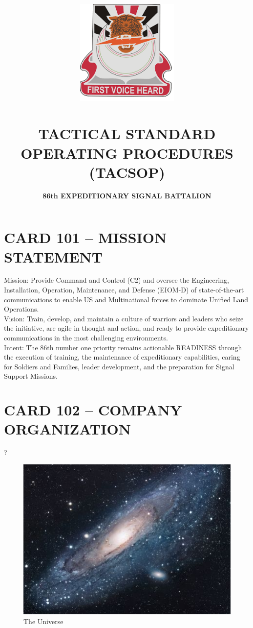 \documentclass{article}
\title{\includegraphics[width=2in]{Pics/86esb.png}\\
\\
\vspace{1.5cm}
\textbf{\LARGE TACTICAL STANDARD OPERATING PROCEDURES (TACSOP)}}
\author{\Large \textbf{86th EXPEDITIONARY SIGNAL BATTALION}}
\date{ }
\begin{document}
\maketitle

\newpage
\section*{CARD 101 – MISSION STATEMENT}
Mission: Provide Command and Control (C2) and oversee the Engineering, Installation, Operation, Maintenance, and Defense (EIOM-D) of state-of-the-art communications to enable US and Multinational forces to dominate Unified Land Operations.
\\
Vision: Train, develop, and maintain a culture of warriors and leaders who seize the initiative, are agile in thought and action, and ready to provide expeditionary communications in the most challenging environments.
\\
Intent: The 86th number one priority remains actionable READINESS through the execution of training, the maintenance of expeditionary capabilities, caring for Soldiers and Families, leader development, and the preparation for Signal Support Missions.

\newpage
\section*{CARD 102 – COMPANY ORGANIZATION}
?
\begin{figure}[h!]
\centering
\includegraphics[scale=1.7]{universe}
\caption{The Universe}
\label{fig:universe}
\end{figure}

\newpage
\end{document}
